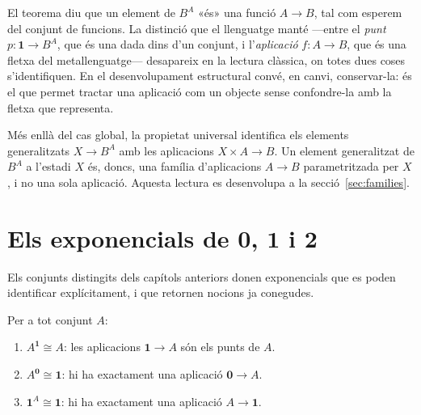 \begin{observacio}\label{obs:punts-exponencial-classica}
El teorema diu que un element de \(B^A\) «és» una funció \(A\to B\), tal
com esperem del conjunt de funcions. La distinció que el llenguatge manté
---entre el \emph{punt} \(p\colon\mathbf1\to B^A\), que és una dada dins
d'un conjunt, i l'\emph{aplicació} \(f\colon A\to B\), que és una fletxa
del metallenguatge--- desapareix en la lectura clàssica, on totes dues coses
s'identifiquen. En el desenvolupament estructural convé, en canvi,
conservar-la: és el que permet tractar una aplicació com un objecte sense
confondre-la amb la fletxa que representa.
\end{observacio}

\begin{observacio}\label{obs:generalitzats-exponencial}
Més enllà del cas global, la propietat universal identifica els elements
generalitzats \(X\to B^A\) amb les aplicacions \(X\times A\to B\). Un
element generalitzat de \(B^A\) a l'estadi \(X\) és, doncs, una família
d'aplicacions \(A\to B\) parametritzada per \(X\), i no una sola
aplicació. Aquesta lectura es desenvolupa a la
secció~\ref{sec:families}.
\end{observacio}

\section{\texorpdfstring{Els exponencials de \(\mathbf0\), \(\mathbf1\) i \(\mathbf2\)}{Els exponencials de 0, 1 i 2}}\label{sec:exponencials-basics}

Els conjunts distingits dels capítols anteriors donen exponencials que es
poden identificar explícitament, i que retornen nocions ja conegudes.

\begin{proposicio}\label{prop:exponencials-basics}
Per a tot conjunt \(A\):
\begin{enumerate}
\item \(A^{\mathbf1}\cong A\): les aplicacions \(\mathbf1\to A\) són els
punts de \(A\).
\item \(A^{\mathbf0}\cong\mathbf1\): hi ha exactament una aplicació
\(\mathbf0\to A\).
\item \(\mathbf1^{A}\cong\mathbf1\): hi ha exactament una aplicació
\(A\to\mathbf1\).
\end{enumerate}
\end{proposicio}

